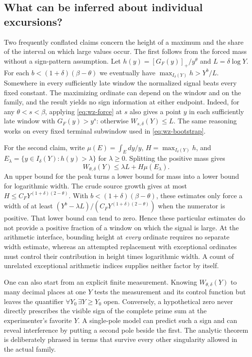 \documentclass[12pt,letterpaper]{article}
\begin{document}
\subsection{What can be inferred about individual excursions?}
Two frequently conflated claims concern the height of a maximum and the share of the interval on which large values occur. The first follows from the forced mass without a sign-pattern assumption. Let \(h(y)=[G_F(y)]_+/y^\theta\) and \(L=\delta\log Y\). For each \(b<(1+\delta)(\beta-\theta)\) we eventually have \(\max_{I_\delta(Y)}h>Y^b/L\). Somewhere in every sufficiently late window the normalized signal beats every fixed constant. The maximizing ordinate can depend on the window and on the family, and the result yields no sign information at either endpoint. Indeed, for any \(\theta<s<\beta\), applying \eqref{eq:wz-force} at \(s\) also gives a point \(y\) in each sufficiently late window with \(G_F(y)>y^s\): otherwise \(W_{s,\delta}(Y)\le L\). The same reasoning works on every fixed terminal subwindow used in \eqref{eq:wz-bootstrap}.

For the second claim, write \(\mu(E)=\int_E dy/y\), \(H=\max_{I_\delta(Y)}h\), and \(E_\lambda=\{y\in I_\delta(Y):h(y)>\lambda\}\) for \(\lambda\ge0\). Splitting the positive mass gives
\[
 W_{\theta,\delta}(Y)\le\lambda L+H\mu(E_\lambda).
\]
An upper bound for the peak turns a lower bound for mass into a lower bound for logarithmic width. The crude source growth gives at most \(H\le C_F Y^{(1+\delta)(2-\theta)}\). With \(b<(1+\delta)(\beta-\theta)\), these estimates only force a width of at least \((Y^b-\lambda L)/(C_F Y^{(1+\delta)(2-\theta)})\) when the numerator is positive. That lower bound can tend to zero. Hence these particular estimates do not provide a positive fraction of a window on which the signal is large. At the arithmetic interface, bounding height at \emph{every} ordinate requires no separate width estimate, whereas an attempted replacement with exceptional ordinates must control their contribution in height times logarithmic width. A count of unrelated exceptional arithmetic indices supplies neither factor by itself.

One can also start from an explicit finite measurement. Knowing \(W_{\theta,\delta}(Y)\) to many decimal places at one \(Y\) tests the measurement and its control function but leaves the quantifier \(\forall Y_0\,\exists Y\ge Y_0\) open. Conversely, a hypothetical zero never directly prescribes the visible sign of the complete prime sum at the experimenter's favorite \(Y\). A single-pole model can predict such a sign and can reveal interference by putting a second pole beside the first. The analytic theorem is deliberately phrased in terms that survive every other singularity allowed in the actual family.
\end{document}
